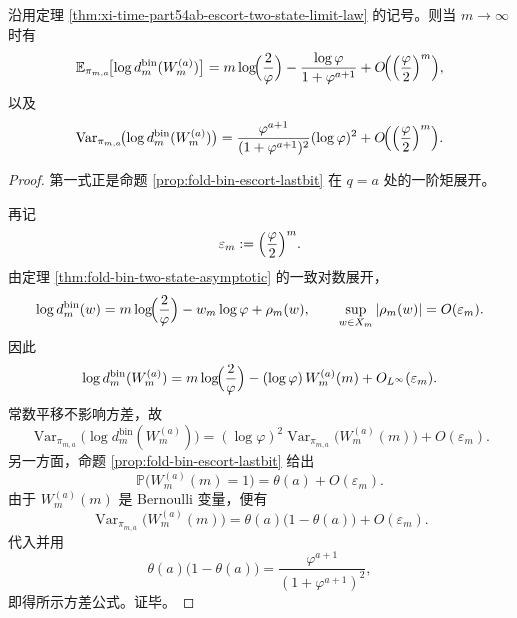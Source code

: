 \begin{theorem}\label{thm:xi-time-part54ab-escort-logdefect-moments}
沿用定理 \ref{thm:xi-time-part54ab-escort-two-state-limit-law} 的记号。则当 \(m\to\infty\) 时有
\[
\mathbb E_{\pi_{m,a}}\!\bigl[\log d_m^{\mathrm{bin}}(W_m^{(a)})\bigr]
=
m\log\!\Bigl(\frac{2}{\varphi}\Bigr)
-\frac{\log\varphi}{1+\varphi^{a+1}}
+O\!\Bigl(\Bigl(\frac{\varphi}{2}\Bigr)^m\Bigr),
\]
以及
\[
\operatorname{Var}_{\pi_{m,a}}\!\bigl(\log d_m^{\mathrm{bin}}(W_m^{(a)})\bigr)
=
\frac{\varphi^{a+1}}{(1+\varphi^{a+1})^2}(\log\varphi)^2
+O\!\Bigl(\Bigl(\frac{\varphi}{2}\Bigr)^m\Bigr).
\]
\end{theorem}
\begin{proof}
第一式正是命题 \ref{prop:fold-bin-escort-lastbit} 在 \(q=a\) 处的一阶矩展开。

再记
\[
\varepsilon_m:=\Bigl(\frac{\varphi}{2}\Bigr)^m.
\]
由定理 \ref{thm:fold-bin-two-state-asymptotic} 的一致对数展开，
\[
\log d_m^{\mathrm{bin}}(w)
=
m\log\!\Bigl(\frac{2}{\varphi}\Bigr)-w_m\log\varphi+\rho_m(w),
\qquad
\sup_{w\in X_m}|\rho_m(w)|=O(\varepsilon_m).
\]
因此
\[
\log d_m^{\mathrm{bin}}(W_m^{(a)})
=
m\log\!\Bigl(\frac{2}{\varphi}\Bigr)
-(\log\varphi)\,W_m^{(a)}(m)
+O_{L^\infty}(\varepsilon_m).
\]
常数平移不影响方差，故
\[
\operatorname{Var}_{\pi_{m,a}}\!\bigl(\log d_m^{\mathrm{bin}}(W_m^{(a)})\bigr)
=
(\log\varphi)^2\operatorname{Var}_{\pi_{m,a}}\!\bigl(W_m^{(a)}(m)\bigr)
+O(\varepsilon_m).
\]
另一方面，命题 \ref{prop:fold-bin-escort-lastbit} 给出
\[
\mathbb P\bigl(W_m^{(a)}(m)=1\bigr)
=
\theta(a)+O(\varepsilon_m).
\]
由于 \(W_m^{(a)}(m)\) 是 Bernoulli 变量，便有
\[
\operatorname{Var}_{\pi_{m,a}}\!\bigl(W_m^{(a)}(m)\bigr)
=
\theta(a)\bigl(1-\theta(a)\bigr)+O(\varepsilon_m).
\]
代入并用
\[
\theta(a)\bigl(1-\theta(a)\bigr)
=
\frac{\varphi^{a+1}}{(1+\varphi^{a+1})^2},
\]
即得所示方差公式。证毕。
\end{proof}

